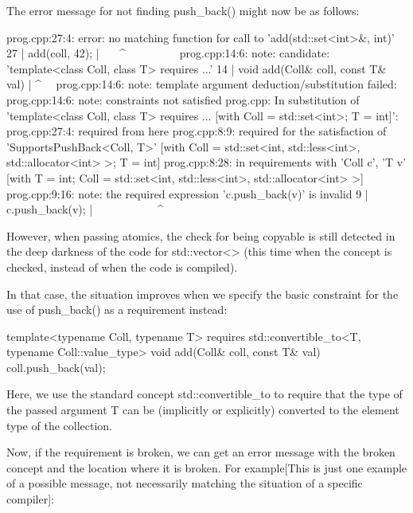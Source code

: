 The error message for not finding push\_back() might now be as follows:

{\scriptsize
\begin{shell}
prog.cpp:27:4: error: no matching function for call to ’add(std::set<int>&, int)’
    27 | add(coll, 42);
        | ~~~^~~~~~~~~~
prog.cpp:14:6: note: candidate: ’template<class Coll, class T> requires ...’
     14 | void add(Coll& coll, const T& val)
         |      ^~~
prog.cpp:14:6: note: template argument deduction/substitution failed:
prog.cpp:14:6: note: constraints not satisfied
prog.cpp: In substitution of ’template<class Coll, class T> requires ...
           [with Coll = std::set<int>; T = int]’:
prog.cpp:27:4: required from here
prog.cpp:8:9: required for the satisfaction of ’SupportsPushBack<Coll, T>’
                  [with Coll = std::set<int, std::less<int>, std::allocator<int> >; T = int]
prog.cpp:8:28: in requirements with ’Coll c’, ’T v’
                      [with T = int; Coll = std::set<int, std::less<int>, std::allocator<int> >]
prog.cpp:9:16: note: the required expression ’c.push_back(v)’ is invalid
      9 | c.push_back(v);
         | ~~~~~~~~~~~^~~
\end{shell}
}

However, when passing atomics, the check for being copyable is still detected in the deep darkness of the code for std::vector<> (this time when the concept is checked, instead of when the code is compiled).

In that case, the situation improves when we specify the basic constraint for the use of push\_back() as a requirement instead:

\begin{cpp}
template<typename Coll, typename T>
requires std::convertible_to<T, typename Coll::value_type>
void add(Coll& coll, const T& val)
{
	coll.push_back(val);
}
\end{cpp}

Here, we use the standard concept std::convertible\_to to require that the type of the passed argument T can be (implicitly or explicitly) converted to the element type of the collection.

Now, if the requirement is broken, we can get an error message with the broken concept and the location where it is broken. For example[This is just one example of a possible message, not necessarily matching the situation of a specific compiler]:

